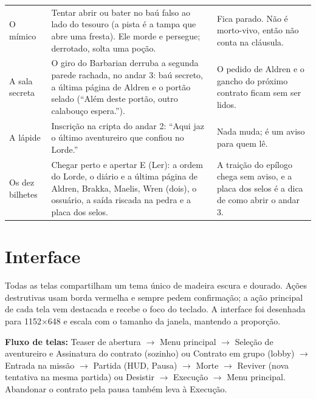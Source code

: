 \documentclass[11pt,a4paper]{article}
\begin{document}
\begin{xltabular}{\textwidth}{@{}>{\raggedright\arraybackslash}p{2.6cm}>{\raggedright\arraybackslash}X>{\raggedright\arraybackslash}X@{}}
O mímico & Tentar abrir ou bater no baú falso ao lado do tesouro (a pista é a tampa que abre uma fresta). Ele morde e persegue; derrotado, solta uma poção. & Fica parado. Não é morto-vivo, então não conta na cláusula. \\
A sala secreta & O giro do Barbarian derruba a segunda parede rachada, no andar 3: baú secreto, a última página de Aldren e o portão selado (``Além deste portão, outro calabouço espera.''). & O pedido de Aldren e o gancho do próximo contrato ficam sem ser lidos. \\
A lápide & Inscrição na cripta do andar 2: ``Aqui jaz o último aventureiro que confiou no Lorde.'' & Nada muda; é um aviso para quem lê. \\
Os dez bilhetes & Chegar perto e apertar E (Ler): a ordem do Lorde, o diário e a última página de Aldren, Brakka, Maelis, Wren (dois), o ossuário, a saída riscada na pedra e a placa dos selos. & A traição do epílogo chega sem aviso, e a placa dos selos é a dica de como abrir o andar 3. \\
\bottomrule
\end{xltabular}


\section{Interface}

Todas as telas compartilham um tema único de madeira escura e dourado. Ações destrutivas usam borda vermelha e sempre pedem confirmação; a ação principal de cada tela vem destacada e recebe o foco do teclado. A interface foi desenhada para 1152$\times$648 e escala com o tamanho da janela, mantendo a proporção.

\textbf{Fluxo de telas:} Teaser de abertura $\rightarrow$ Menu principal $\rightarrow$ Seleção de aventureiro e Assinatura do contrato (sozinho) ou Contrato em grupo (lobby) $\rightarrow$ Entrada na missão $\rightarrow$ Partida (HUD, Pausa) $\rightarrow$ Morte $\rightarrow$ Reviver (nova tentativa na mesma partida) ou Desistir $\rightarrow$ Execução $\rightarrow$ Menu principal. Abandonar o contrato pela pausa também leva à Execução.
\end{document}
